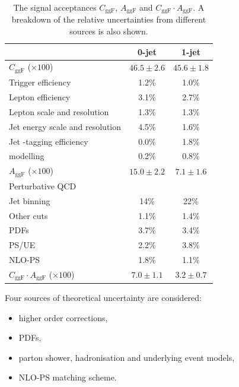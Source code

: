 \begin{table}[t]
	\begin{tabular}{l@{}c@{\hskip 0.2in}c}
		\toprule
		& 0-jet & 1-jet \\
		\midrule
		$C_{\text{ggF}}$ ($\times 100$) & $46.5\pm2.6$ & $45.6\pm1.8$ \\
		\quad Trigger efficiency              & 1.2\% & 1.0\% \\
		\quad Lepton efficiency               & 3.1\% & 2.7\% \\
		\quad Lepton \pt scale and resolution & 1.3\% & 1.3\% \\
		\quad Jet energy scale and resolution & 4.5\% & 1.6\% \\
		\quad Jet \Pbottom-tagging efficiency & 0.0\% & 1.8\% \\
		\quad \met modelling                  & 0.2\% & 0.8\% \\
		\cmidrule(lr){1-3}
		$A_{\text{ggF}}$ ($\times 100$) & $15.0\pm2.2$ & $7.1\pm1.6$ \\
		\quad Perturbative QCD \\
		\quad\quad Jet binning & 14\%  & 22\%  \\
		\quad\quad Other cuts  & 1.1\% & 1.4\% \\
		\quad PDFs             & 3.7\% & 3.4\% \\
		\quad PS/UE            & 2.2\% & 3.8\% \\
		\quad NLO-PS           & 1.8\% & 1.1\% \\
		\cmidrule(lr){1-3}
		$C_{\text{ggF}} \cdot A_{\text{ggF}}$ ($\times 100$) & $7.0\pm1.1$ & $3.2\pm0.7$ \\
		\bottomrule
	\end{tabular}
	\caption{The signal acceptances $C_{\text{ggF}}$, $A_{\text{ggF}}$ and $C_{\text{ggF}} 
	\cdot A_{\text{ggF}}$. A breakdown of the relative uncertainties from different sources 
	is also shown.}
	\label{tab:ggF:cggF_aggF}
\end{table}

\newpage
Four sources of theoretical uncertainty are considered:
\begin{itemize}[noitemsep,nolistsep]
	\item higher order corrections,
	\item PDFs,
	\item parton shower, hadronisation and underlying event models,
	\item NLO-PS matching scheme.
\end{itemize}

